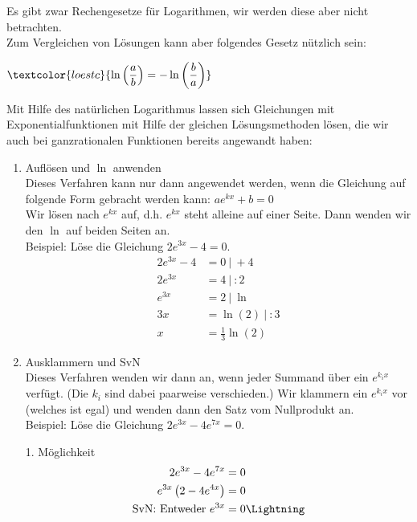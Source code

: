 \newpage
Es gibt zwar Rechengesetze für Logarithmen, wir werden diese aber nicht betrachten.\\
Zum Vergleichen von Lösungen kann aber folgendes Gesetz nützlich sein:
\begin{tcolorbox}\centering
	\(\textcolor{loestc}{\ln\left(\dfrac{a}{b}\right)=-\ln\left(\dfrac{b}{a}\right)}\)
\end{tcolorbox}
Mit Hilfe des natürlichen Logarithmus lassen sich Gleichungen mit Exponentialfunktionen mit Hilfe der gleichen Lösungsmethoden lösen, die wir auch bei ganzrationalen Funktionen bereits angewandt haben:
\begin{enumerate}[label=\arabic*)]
	\item Auflösen und \(\ln\) anwenden\\
	Dieses Verfahren kann nur dann angewendet werden, wenn die Gleichung auf folgende Form gebracht werden kann: \(ae^{kx}+b=0\)\\
	Wir lösen nach \(e^{kx}\) auf, d.h. \(e^{kx}\) steht alleine auf einer Seite. Dann wenden wir den \(\ln\) auf beiden Seiten an.\\
	Beispiel: Löse die Gleichung \(2e^{3x}-4=0\).
	\textcolor{loes}{\begin{align*}
			2e^{3x}-4&=0\ |\ +4\\
			2e^{3x}&=4\ |\ :2\\
			e^{3x}&=2\ |\ \ln\\
			3x&=\ln\left(2\right)\ |\ :3\\
			x&=\frac{1}{3}\ln\left(2\right)
	\end{align*}}
	\item Ausklammern und SvN\\
	Dieses Verfahren wenden wir dann an, wenn jeder Summand über ein \(e^{k_ix}\) verfügt. (Die \(k_i\) sind dabei paarweise verschieden.) Wir klammern ein \(e^{k_ix}\) vor (welches ist egal) und wenden dann den Satz vom Nullprodukt an.\\
	Beispiel: Löse die Gleichung \(2e^{3x}-4e^{7x}=0\).\\
	\begin{minipage}{\textwidth}\vspace{.15cm}
		\begin{minipage}[t]{0.49\textwidth}
			1. Möglichkeit
			\textcolor{loes}{\begin{align*}
					2e^{3x}-4e^{7x}&=0\\
					e^{3x}\left(2-4e^{4x}\right) &=0\\
					\text{SvN: Entweder }e^{3x}&=0 \text{\Lightning}\\

\end{align*}}
\end{minipage}
\end{minipage}
\end{enumerate}
